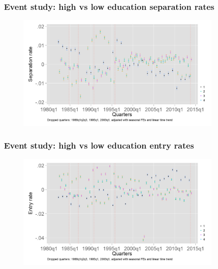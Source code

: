\documentclass[aspectratio=169]{beamer}
\begin{document}
\begin{frame}
    \frametitle{Event study: high vs low education separation rates}

    \begin{figure}[]
        \centering
        \includegraphics[width=0.9\textwidth]{../output/separation_rate_educ.png}
    \end{figure}

\end{frame}

\begin{frame}
    \frametitle{Event study: high vs low education entry rates}

    \begin{figure}[]
        \centering
        \includegraphics[width=0.9\textwidth]{../output/accession_rate_educ.png}
    \end{figure}

\end{frame}
\end{document}
